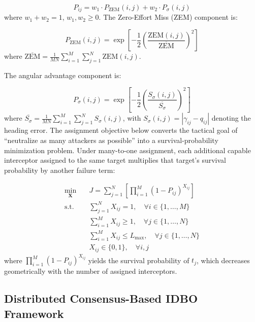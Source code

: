 \documentclass[lettersize,journal]{IEEEtran}
\begin{document}
\begin{equation}
\label{eq:interception_probability}
P_{ij} = w_1 \cdot P_{\text{ZEM}}(i,j) + w_2 \cdot P_{\sigma}(i,j)
\end{equation}
where $w_1 + w_2 = 1$, $w_1, w_2 \geq 0$. The Zero-Effort Miss (ZEM) component is:

\begin{equation}
\label{eq:zem_prob}
P_{\text{ZEM}}(i,j) = \exp\left[-\frac{1}{2}\left(\frac{\text{ZEM}(i,j)}{\overline{\text{ZEM}}}\right)^2\right]
\end{equation}
where $\overline{\text{ZEM}} = \frac{1}{MN}\sum_{i=1}^{M}\sum_{j=1}^{N} \text{ZEM}(i,j)$.

The angular advantage component is:

\begin{equation}
\label{eq:angular_prob}
P_{\sigma}(i,j) = \exp\left[-\frac{1}{2}\left(\frac{S_{\sigma}(i,j)}{\overline{S_{\sigma}}}\right)^2\right]
\end{equation}
where $\overline{S_{\sigma}} = \frac{1}{MN}\sum_{i=1}^{M}\sum_{j=1}^{N} S_{\sigma}(i,j)$, with $S_{\sigma}(i,j) = |\gamma_{ij} - q_{ij}|$ denoting the heading error. The assignment objective below converts the tactical goal of ``neutralize as many attackers as possible'' into a survival-probability minimization problem. Under many-to-one assignment, each additional capable interceptor assigned to the same target multiplies that target's survival probability by another failure term:

\begin{equation}
\label{eq:optimization_formulation}
\begin{aligned}
\min_{\mathbf{X}} \quad & J = \sum_{j=1}^{N} \left[ \prod_{i=1}^{M} \left(1 - P_{ij}\right)^{X_{ij}} \right] \\
\text{s.t.} \quad & \sum_{j=1}^{N} X_{ij} = 1, \quad \forall i \in \{1,\dots,M\} \\
& \sum_{i=1}^{M} X_{ij} \geq 1, \quad \forall j \in \{1,\dots,N\} \\
& \sum_{i=1}^{M} X_{ij} \leq L_{\max}, \quad \forall j \in \{1,\dots,N\} \\
& X_{ij} \in \{0,1\}, \quad \forall i,j
\end{aligned}
\end{equation}
where $\prod_{i=1}^{M} (1 - P_{ij})^{X_{ij}}$ yields the survival probability of $t_j$, which decreases geometrically with the number of assigned interceptors.

\subsection{Distributed Consensus-Based IDBO Framework}
\label{subsec:idbo_algorithm}
\end{document}
